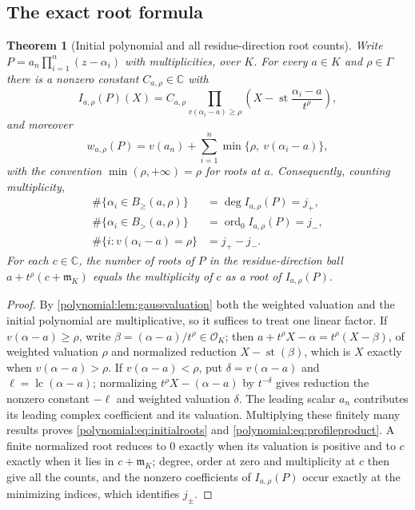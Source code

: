 \documentclass[11pt,letterpaper]{article}
\numberwithin{equation}{section}
\newtheorem{theorem}{Theorem}[section]
\theoremstyle{definition}
\theoremstyle{remark}\newtheorem{remark}[theorem]{Remark}
\newcommand{\C}{\mathbb C}
\newcommand{\OO}{\mathcal O}
\newcommand{\mm}{\mathfrak m}
\newcommand{\st}{\operatorname{st}}
\newcommand{\ord}{\operatorname{ord}}
\newcommand{\lc}{\operatorname{lc}}
\newcommand{\Bge}[2]{B_{\ge}(#1,#2)}
\newcommand{\Bgt}[2]{B_{>}(#1,#2)}
\begin{document}
\subsection{The exact root formula}
\begin{theorem}[Initial polynomial and all residue-direction root counts]
\label{polynomial:thm:initialroots}
Write $P=a_n\prod_{i=1}^n(z-\alpha_i)$ with multiplicities, over $K$. For
every $a\in K$ and $\rho\in\Gamma$ there is a nonzero constant
$C_{a,\rho}\in\C$ with
\begin{equation}\label{polynomial:eq:initialroots}
 \boxed{\displaystyle
 I_{a,\rho}(P)(X)=C_{a,\rho}\!\!\prod_{v(\alpha_i-a)\ge\rho}\!\!
 \left(X-\st\frac{\alpha_i-a}{t^\rho}\right),}
\end{equation}
and moreover
\begin{equation}\label{polynomial:eq:profileproduct}
 w_{a,\rho}(P)=v(a_n)+\sum_{i=1}^n\min\{\rho,\ v(\alpha_i-a)\},
\end{equation}
with the convention $\min(\rho,+\infty)=\rho$ for roots at $a$. Consequently,
counting multiplicity,
\begin{align}
 \#\{\alpha_i\in\Bge a\rho\}&=\deg I_{a,\rho}(P)=j_+,
 \label{polynomial:eq:closedcount}\\
 \#\{\alpha_i\in\Bgt a\rho\}&=\ord_0I_{a,\rho}(P)=j_-,
 \label{polynomial:eq:opencount}\\
 \#\{i:v(\alpha_i-a)=\rho\}&=j_+-j_- .\label{polynomial:eq:shellcount}
\end{align}
For each $c\in\C$, the number of roots of $P$ in the residue-direction ball
$a+t^\rho(c+\mm_K)$ equals the multiplicity of $c$ as a root of
$I_{a,\rho}(P)$.
\end{theorem}
\begin{proof}
By \cref{polynomial:lem:gaussvaluation} both the weighted valuation and the
initial polynomial are multiplicative, so it suffices to treat one linear
factor. If $v(\alpha-a)\ge\rho$, write $\beta=(\alpha-a)/t^\rho\in\OO_K$;
then $a+t^\rho X-\alpha=t^\rho(X-\beta)$, of weighted valuation $\rho$ and
normalized reduction $X-\st(\beta)$, which is $X$ exactly when
$v(\alpha-a)>\rho$. If $v(\alpha-a)<\rho$, put $\delta=v(\alpha-a)$ and
$\ell=\lc(\alpha-a)$; normalizing $t^\rho X-(\alpha-a)$ by $t^{-\delta}$ gives
reduction the nonzero constant $-\ell$ and weighted valuation $\delta$. The
leading scalar $a_n$ contributes its leading complex coefficient and its
valuation. Multiplying these finitely many results proves
\eqref{polynomial:eq:initialroots} and
\eqref{polynomial:eq:profileproduct}. A finite normalized root reduces to $0$
exactly when its valuation is positive and to $c$ exactly when it lies in
$c+\mm_K$; degree, order at zero and multiplicity at $c$ then give all the
counts, and the nonzero coefficients of $I_{a,\rho}(P)$ occur exactly at the
minimizing indices, which identifies $j_\pm$.
\end{proof}
\end{document}
